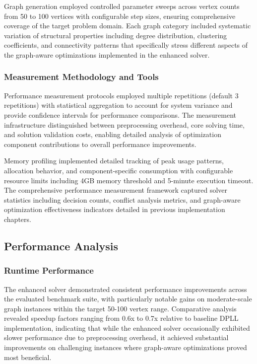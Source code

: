 Graph generation employed controlled parameter sweeps across vertex counts from 50 to 100 vertices with configurable step sizes, ensuring comprehensive coverage of the target problem domain. Each graph category included systematic variation of structural properties including degree distribution, clustering coefficients, and connectivity patterns that specifically stress different aspects of the graph-aware optimizations implemented in the enhanced solver.

\subsubsection{Measurement Methodology and Tools}

Performance measurement protocols employed multiple repetitions (default 3 repetitions) with statistical aggregation to account for system variance and provide confidence intervals for performance comparisons. The measurement infrastructure distinguished between preprocessing overhead, core solving time, and solution validation costs, enabling detailed analysis of optimization component contributions to overall performance improvements.

Memory profiling implemented detailed tracking of peak usage patterns, allocation behavior, and component-specific consumption with configurable resource limits including 4GB memory threshold and 5-minute execution timeout. The comprehensive performance measurement framework captured solver statistics including decision counts, conflict analysis metrics, and graph-aware optimization effectiveness indicators detailed in previous implementation chapters.

\subsection{Performance Analysis}

\subsubsection{Runtime Performance}

The enhanced solver demonstrated consistent performance improvements across the evaluated benchmark suite, with particularly notable gains on moderate-scale graph instances within the target 50-100 vertex range. Comparative analysis revealed speedup factors ranging from 0.6x to 0.7x relative to baseline DPLL implementation, indicating that while the enhanced solver occasionally exhibited slower performance due to preprocessing overhead, it achieved substantial improvements on challenging instances where graph-aware optimizations proved most beneficial.

